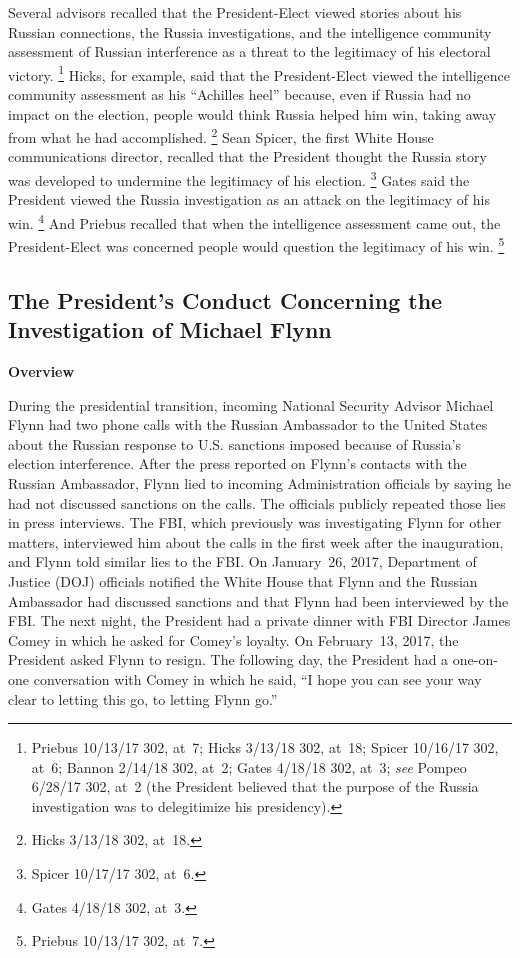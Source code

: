 Several advisors recalled that the President-Elect viewed stories about his Russian connections, the Russia investigations, and the intelligence community assessment of Russian interference as a threat to the legitimacy of his electoral victory.%
\footnote{Priebus 10/13/17 302, at~7;
Hicks 3/13/18 302, at~18;
Spicer 10/16/17 302, at~6;
Bannon 2/14/18 302, at~2;
Gates 4/18/18 302, at~3;
\textit{see} Pompeo 6/28/17 302, at~2 (the President believed that the purpose of the Russia investigation was to delegitimize his presidency).}
Hicks, for example, said that the President-Elect viewed the intelligence community assessment as his ``Achilles heel'' because, even if Russia had no impact on the election, people would think Russia helped him win, taking away from what he had accomplished.%
\footnote{Hicks 3/13/18 302, at~18.}
Sean Spicer, the first White House communications director, recalled that the President thought the Russia story was developed to undermine the legitimacy of his election.%
\footnote{Spicer 10/17/17 302, at~6.}
Gates said the President viewed the Russia investigation as an attack on the legitimacy of his win.%
\footnote{Gates 4/18/18 302, at~3.}
And Priebus recalled that when the intelligence assessment came out, the President-Elect was concerned people would question the legitimacy of his win.%
\footnote{Priebus 10/13/17 302, at~7.}

\subsection{The President's Conduct Concerning the Investigation of Michael Flynn}

\begin{center}
\textbf{Overview}
\end{center}

During the presidential transition, incoming National Security Advisor Michael Flynn had two phone calls with the Russian Ambassador to the United States about the Russian response to U.S. sanctions imposed because of Russia's election interference.
After the press reported on Flynn's contacts with the Russian Ambassador, Flynn lied to incoming Administration officials by saying he had not discussed sanctions on the calls.
The officials publicly repeated those lies in press interviews.
The FBI, which previously was investigating Flynn for other matters, interviewed him about the calls in the first week after the inauguration, and Flynn told similar lies to the FBI.
On January~26, 2017, Department of Justice (DOJ) officials notified the White House that Flynn and the Russian Ambassador had discussed sanctions and that Flynn had been interviewed by the FBI.
The next night, the President had a private dinner with FBI Director James Comey in which he asked for Comey's loyalty.
On February~13, 2017, the President asked Flynn to resign.
The following day, the President had a one-on-one conversation with Comey in which he said, ``I hope you can see your way clear to letting this go, to letting Flynn go.''

